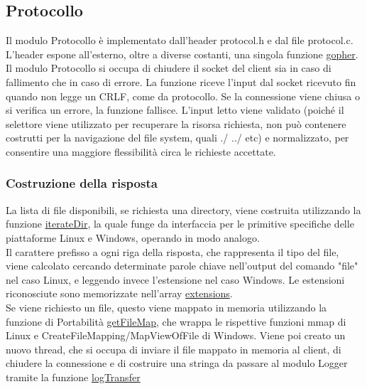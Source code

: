\documentclass{article}
\begin{document}
\subsection{Protocollo}

Il modulo Protocollo è implementato dall'header protocol.h e dal file protocol.c.
L'header espone all'esterno, oltre a diverse costanti, una singola funzione \href{}{gopher}.
Il modulo Protocollo si occupa di chiudere il socket del client sia in caso di fallimento che in caso di errore.
La funzione riceve l'input dal socket ricevuto fin quando non legge un CRLF, come da protocollo.
Se la connessione viene chiusa o si verifica un errore, la funzione fallisce.
L'input letto viene validato (poiché il selettore viene utilizzato per recuperare la risorsa
richiesta, non può contenere costrutti per la navigazione del file system, quali ./ ../ etc) e normalizzato,
per consentire una maggiore flessibilità circa le richieste accettate.

\subsubsection{Costruzione della risposta}
La lista di file disponibili, se richiesta una directory, viene costruita utilizzando la funzione \href{}
{iterateDir}, la quale funge da interfaccia per le primitive specifiche delle piattaforme Linux e Windows,
operando in modo analogo.\\
Il carattere prefisso a ogni riga della risposta, che rappresenta il tipo del file, viene calcolato
cercando determinate parole chiave nell'output del comando "file" nel caso Linux, e leggendo invece
l'estensione nel caso Windows. Le estensioni riconosciute sono memorizzate nell'array \href{}{extensions}.\\
Se viene richiesto un file, questo viene mappato in memoria utilizzando la funzione di 
Portabilità \href{}{getFileMap}, che wrappa le rispettive funzioni
mmap di Linux e CreateFileMapping/MapViewOfFile di Windows. Viene poi creato un nuovo thread, che si occupa di
inviare il file mappato in memoria al client, di chiudere la connessione e di costruire una stringa da passare al
modulo Logger tramite la funzione \href{}{logTransfer}
\end{document}
